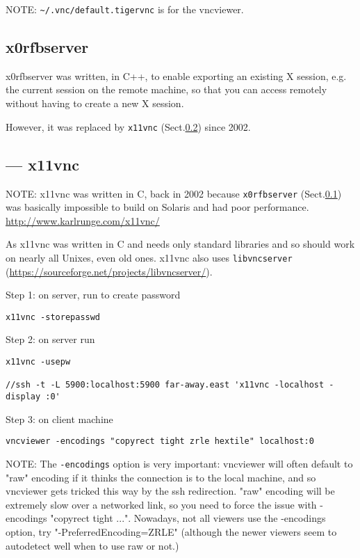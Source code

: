 NOTE: \verb!~/.vnc/default.tigervnc! is for the vncviewer.


\subsection{x0rfbserver}
\label{sec:x0rfbserver}

x0rfbserver was written, in C++, to enable exporting an existing X session, e.g.
the current session on the remote machine, so that you can access remotely
without having to create a new X session.

However, it was replaced by \verb!x11vnc! (Sect.\ref{sec:x11vnc}) since 2002.


\subsection{--- x11vnc}
\label{sec:x11vnc}

NOTE: x11vnc was written in C, back in 2002 because \verb!x0rfbserver!
(Sect.\ref{sec:x0rfbserver}) was basically impossible to build on Solaris and
had poor performance. \url{http://www.karlrunge.com/x11vnc/}

As x11vnc was written in C and needs only standard libraries and so should
work on nearly all Unixes, even old ones. x11vnc also uses \verb!libvncserver!
(\url{https://sourceforge.net/projects/libvncserver/}). 


Step 1: on server, run to create password
\begin{verbatim}
x11vnc -storepasswd 
\end{verbatim}


Step 2: on server run
\begin{verbatim}
x11vnc -usepw

//ssh -t -L 5900:localhost:5900 far-away.east 'x11vnc -localhost -display :0'
\end{verbatim}



Step 3: on client machine
\begin{verbatim}
vncviewer -encodings "copyrect tight zrle hextile" localhost:0
\end{verbatim}

NOTE: The \verb!-encodings! option is very important: vncviewer will often
default to "raw" encoding if it thinks the connection is to the local machine,
and so vncviewer gets tricked this way by the ssh redirection. "raw" encoding
will be extremely slow over a networked link, so you need to force the issue
with -encodings "copyrect tight ...". Nowadays, not all viewers use the
-encodings option, try "-PreferredEncoding=ZRLE" (although the newer viewers
seem to autodetect well when to use raw or not.)



